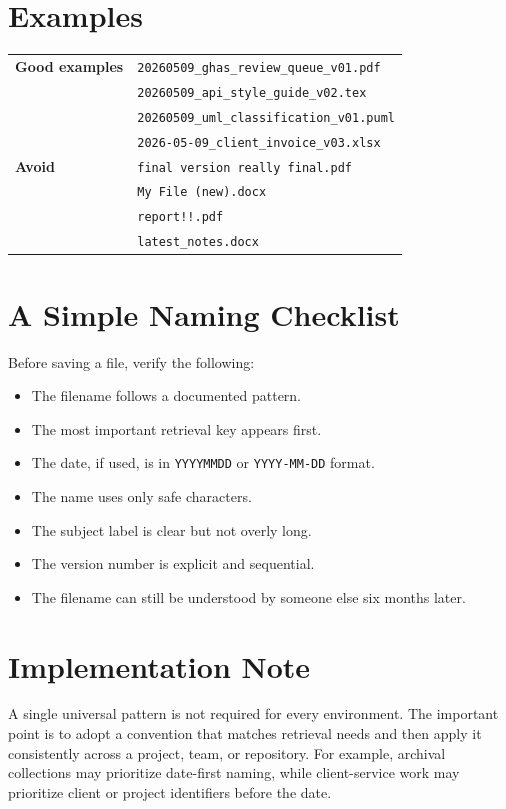 \documentclass[11pt,letterpaper]{article}
\newcommand{\code}[1]{\texttt{#1}}
\newcommand{\best}[1]{\texttt{#1}}
\begin{document}
\section*{Examples}

\begin{tabularx}{\textwidth}{>{\bfseries}p{1.25in}X}
\toprule
Good examples & \best{20260509\_ghas\_review\_queue\_v01.pdf}\\
& \best{20260509\_api\_style\_guide\_v02.tex}\\
& \best{20260509\_uml\_classification\_v01.puml}\\
& \best{2026-05-09\_client\_invoice\_v03.xlsx}\\
\midrule
Avoid & \best{final version really final.pdf}\\
& \best{My File (new).docx}\\
& \best{report!!.pdf}\\
& \best{latest\_notes.docx}\\
\bottomrule
\end{tabularx}

\section*{A Simple Naming Checklist}

Before saving a file, verify the following:

\begin{itemize}
  \item The filename follows a documented pattern.
  \item The most important retrieval key appears first.
  \item The date, if used, is in \code{YYYYMMDD} or \code{YYYY-MM-DD} format.
  \item The name uses only safe characters.
  \item The subject label is clear but not overly long.
  \item The version number is explicit and sequential.
  \item The filename can still be understood by someone else six months later.
\end{itemize}

\section*{Implementation Note}

A single universal pattern is not required for every environment. The important point is to adopt a convention that matches retrieval needs and then apply it consistently across a project, team, or repository. For example, archival collections may prioritize date-first naming, while client-service work may prioritize client or project identifiers before the date.\cite{harvard,nara}
\end{document}
